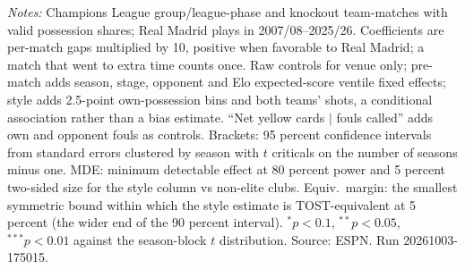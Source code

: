 \begin{table}[H]
\begin{minipage}{\textwidth}
\textit{Notes:} Champions League group/league-phase and knockout team-matches with valid possession shares; Real Madrid plays in 2007/08--2025/26. Coefficients are per-match gaps multiplied by 10, positive when favorable to Real Madrid; a match that went to extra time counts once. Raw controls for venue only; pre-match adds season, stage, opponent and Elo expected-score ventile fixed effects; style adds 2.5-point own-possession bins and both teams' shots, a conditional association rather than a bias estimate. ``Net yellow cards $|$ fouls called'' adds own and opponent fouls as controls. Brackets: 95 percent confidence intervals from standard errors clustered by season with $t$ criticals on the number of seasons minus one. MDE: minimum detectable effect at 80 percent power and 5 percent two-sided size for the style column vs non-elite clubs. Equiv.\ margin: the smallest symmetric bound within which the style estimate is TOST-equivalent at 5 percent (the wider end of the 90 percent interval). $^{*}p<0.1$, $^{**}p<0.05$, $^{***}p<0.01$ against the season-block $t$ distribution. Source: ESPN. Run 20261003-175015.
\end{minipage}
\end{table}
